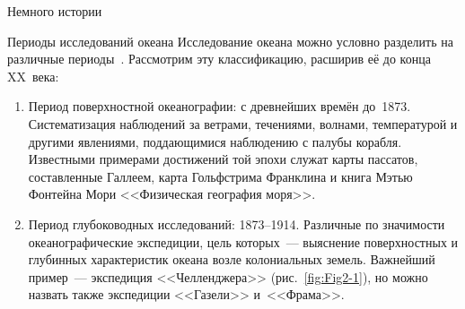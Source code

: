 \begin{chapter}{Немного истории}
\begin{section}{Периоды исследований океана}
Исследование океана можно условно разделить на различные периоды~\cite{Wust:1964}. 
Рассмотрим эту классификацию, расширив её до конца XX~века:
%
\begin{enumerate}
\item  
Период поверхностной океанографии: с древнейших времён до~1873. 
Систематизация наблюдений за ветрами,
течениями, волнами, температурой и другими явлениями, поддающимися
наблюдению с палубы корабля. Известными примерами достижений той эпохи 
служат карты пассатов, составленные Галлеем, карта Гольфстрима Франклина 
и книга Мэтью Фонтейна Мори <<Физическая география моря>>.
%

\item
Период глубоководных исследований: 1873--1914.
Различные по значимости океанографические экспедиции, цель 
которых~--- выяснение поверхностных и глубинных характеристик океана возле
колониальных земель. Важнейший пример~--- экспедиция
<<Челленджера>> (рис.~\ref{fig:Fig2-1}), но можно назвать также экспедиции 
<<Газели>> и~<<Фрама>>.
%


\end{enumerate}
\end{section}
\end{chapter}
